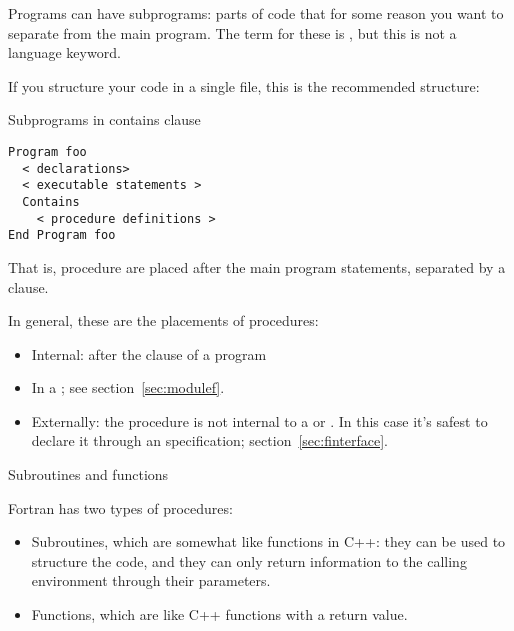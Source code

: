 
Programs can have subprograms: parts of code that for some reason you
want to separate from the main program. The term for these is
, but this is not a language keyword.

If you structure your code in a single
file, this is the recommended structure:

\begin{block}{Subprograms in contains clause}
  \label{sl:contains}
\begin{lstlisting}
Program foo
  < declarations>
  < executable statements >
  Contains
    < procedure definitions >
End Program foo
\end{lstlisting}
\end{block}

That is, procedure are placed after the main program statements,
separated by a  clause.

In general, these are the  placements of procedures:
\begin{itemize}
\item Internal: after the  clause of a program
\item In a ; see section~\ref{sec:modulef}.
\item Externally: the procedure is not internal to a  or
  . In this case it's safest to declare it through an
   specification; section~\ref{sec:finterface}.
\end{itemize}

 {Subroutines and functions}

Fortran has two types of procedures:
\begin{itemize}
\item Subroutines, which are somewhat like  functions in C++:
  they can be used to structure the code, and they can only return
  information to the calling environment through their parameters.
\item Functions, which are like C++ functions with a return value.
\end{itemize}

